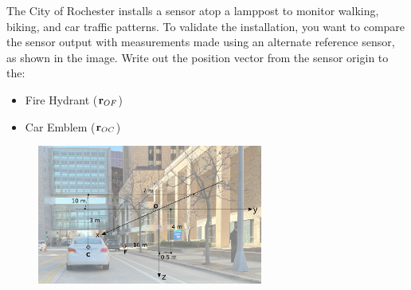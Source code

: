 
The City of Rochester installs a sensor atop a lamppost to monitor walking, biking, and car traffic patterns.  To validate the installation, you want to compare the sensor output with measurements made using an alternate reference sensor, as shown in the image.  Write out the position vector from the sensor origin to the:
\begin{itemize}
  \item Fire Hydrant (${\bf r}_{OF}$)
  \item Car Emblem (${\bf r}_{OC}$)
\end{itemize}

\begin{figure}[ht!]
  \centering
  \includegraphics[height=1.8in]{3d-street-buildings.png}
\end{figure}

